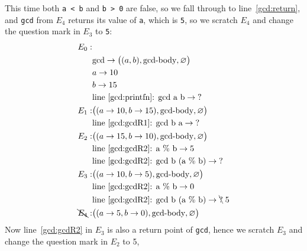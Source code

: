 This time both \lstinline!a < b! and \lstinline!b > 0! are false, so we fall through to line~\ref{gcd:return}, and \lstinline!gcd! from $E_4$ returns its value of \lstinline!a!, which is \lstinline!5!, so we scratch $E_4$ and change the question mark in $E_3$ to \lstinline!5!:
\begin{align*}
  E_0:&\\
      & \text{gcd} \rightarrow \big((a, b), \text{gcd-body}, \varnothing\big)\\
      & a \rightarrow 10\\
      & b \rightarrow 15\\
      & \text{line~\ref{gcd:printfn}: gcd a b} \rightarrow \text{?}\\
  E_1:& \big((a \rightarrow 10, b \rightarrow 15), \text{gcd-body}, \varnothing\big)\\
      & \text{line~\ref{gcd:gcdR1}: gcd b a} \rightarrow \text{?}\\
  E_2:& \big((a \rightarrow 15, b \rightarrow 10), \text{gcd-body}, \varnothing\big)\\
      & \text{line~\ref{gcd:gcdR2}: a \% b} \rightarrow 5\\
      & \text{line~\ref{gcd:gcdR2}: gcd b (a \% b)} \rightarrow \text{?}\\
  E_3:& \big((a \rightarrow 10, b \rightarrow 5), \text{gcd-body}, \varnothing\big)\\
      & \text{line~\ref{gcd:gcdR2}: a \% b} \rightarrow 0\\
      & \text{line~\ref{gcd:gcdR2}: gcd b (a \% b)} \rightarrow \bcancel{\text{?}}\; 5\\
  \bcancel{E_4}:& \big((a \rightarrow 5, b \rightarrow 0), \text{gcd-body}, \varnothing\big)\\
\end{align*}
Now line~\ref{gcd:gcdR2} in $E_3$ is also a return point of \lstinline!gcd!, hence we scratch $E_3$ and change the question mark in $E_2$ to 5,
